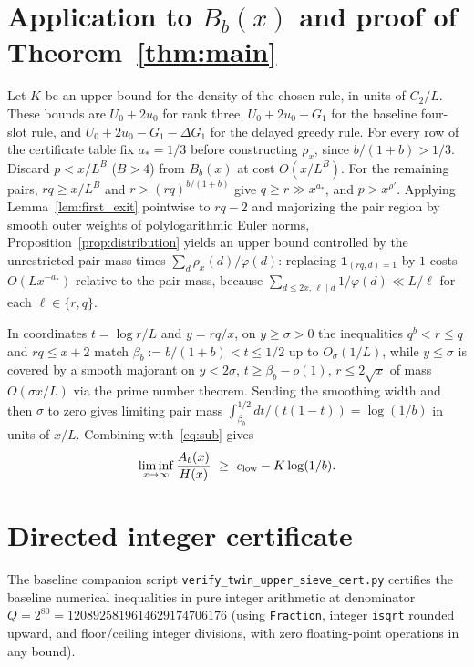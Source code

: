 \documentclass[11pt,reqno]{amsart}
\theoremstyle{remark}
\newcommand{\ind}{\mathbf{1}}
\numberwithin{equation}{section}
\begin{document}
\section{Application to $B_b(x)$ and proof of Theorem~\ref{thm:main}}\label{sec:bad_pairs}

Let $K$ be an upper bound for the density of the chosen rule, in units of $C_2/L$. These bounds are $U_0+2u_0$ for rank three, $U_0+2u_0-G_1$ for the baseline four-slot rule, and $U_0+2u_0-G_1-\Delta G_1$ for the delayed greedy rule. For every row of the certificate table fix $a_*=1/3$ before constructing $\rho_x$, since $b/(1+b)>1/3$. Discard $p<x/L^B$ ($B>4$) from $B_b(x)$ at cost $O(x/L^B)$. For the remaining pairs, $rq\ge x/L^B$ and $r>(rq)^{b/(1+b)}$ give $q\ge r\gg x^{a_*}$, and $p>x^{\rho'}$. Applying Lemma~\ref{lem:first_exit} pointwise to $rq - 2$ and majorizing the pair region by smooth outer weights of polylogarithmic Euler norms, Proposition~\ref{prop:distribution} yields an upper bound controlled by the unrestricted pair mass times $\sum_d \rho_x(d)/\varphi(d)$: replacing $\ind_{(rq,d)=1}$ by $1$ costs $O(L x^{-a_*})$ relative to the pair mass, because $\sum_{d \le 2x,\, \ell \mid d} 1/\varphi(d) \ll L/\ell$ for each $\ell \in \{r,q\}$.

In coordinates $t = \log r/L$ and $y = rq/x$, on $y \ge \sigma > 0$ the inequalities $q^b < r \le q$ and $rq \le x+2$ match $\beta_b := b/(1+b) < t \le 1/2$ up to $O_\sigma(1/L)$, while $y \le \sigma$ is covered by a smooth majorant on $y < 2\sigma$, $t \ge \beta_b - o(1)$, $r \le 2\sqrt{x}$ of mass $O(\sigma x/L)$ via the prime number theorem. Sending the smoothing width and then $\sigma$ to zero gives limiting pair mass $\int_{\beta_b}^{1/2} dt/(t(1-t)) = \log(1/b)$ in units of $x/L$. Combining with~\eqref{eq:sub} gives
\begin{equation}\label{eq:final_sub}
\liminf_{x\to\infty}\frac{A_b(x)}{H(x)}
\ \ge\ c_{\rm low} - K\log(1/b).
\end{equation}

\section{Directed integer certificate}\label{sec:certificate}

The baseline companion script \texttt{verify\_twin\_upper\_sieve\_cert.py} certifies the baseline numerical inequalities in pure integer arithmetic at denominator $Q = 2^{80} = 1208925819614629174706176$ (using \texttt{Fraction}, integer \texttt{isqrt} rounded upward, and floor/ceiling integer divisions, with zero floating-point operations in any bound).
\end{document}
